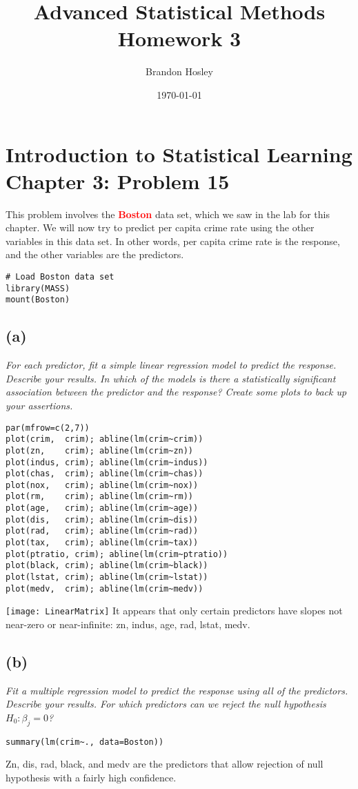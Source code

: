 \documentclass[a4paper,man,natbib]{apa6}
\title{Advanced Statistical Methods Homework 3}
\author{Brandon Hosley}
\date{\today}
\affiliation{University of Illinois - Springfield}
\begin{document}
\maketitle
\singlespacing

\section{Introduction to Statistical Learning \\ Chapter 3: Problem 15}
This problem involves the \textbf{\textcolor{red}{Boston}} data set, 
which we saw in the lab for this chapter. 
We will now try to predict per capita crime rate
using the other variables in this data set. 
In other words, per capita crime rate is the response, 
and the other variables are the predictors.

\begin{verbatim}
# Load Boston data set
library(MASS)
mount(Boston)
\end{verbatim}

\subsection{(a)} 
\emph{
	For each predictor, 
	fit a simple linear regression model to predict the response. 
	Describe your results. 
	In which of the models is there a statistically significant association
	between the predictor and the response? 
	Create some plots to back up your assertions.}
\begin{verbatim}
par(mfrow=c(2,7))
plot(crim,  crim); abline(lm(crim~crim)) 
plot(zn,    crim); abline(lm(crim~zn)) 
plot(indus, crim); abline(lm(crim~indus)) 
plot(chas,  crim); abline(lm(crim~chas))
plot(nox,   crim); abline(lm(crim~nox)) 
plot(rm,    crim); abline(lm(crim~rm))  
plot(age,   crim); abline(lm(crim~age))  
plot(dis,   crim); abline(lm(crim~dis))  
plot(rad,   crim); abline(lm(crim~rad))  
plot(tax,   crim); abline(lm(crim~tax))    
plot(ptratio, crim); abline(lm(crim~ptratio))
plot(black, crim); abline(lm(crim~black))
plot(lstat, crim); abline(lm(crim~lstat))
plot(medv,  crim); abline(lm(crim~medv))
\end{verbatim}
\texttt{[image: LinearMatrix]}
It appears that only certain predictors have slopes not near-zero or near-infinite:
zn, indus, age, rad, lstat, medv.

\subsection{(b)}
\emph{
	Fit a multiple regression model to predict the 
	response using all of the predictors. 
	Describe your results. 
	For which predictors can we reject the null hypothesis 
	$H_0 : \beta_j = 0$?
}
\begin{verbatim}
summary(lm(crim~., data=Boston))
\end{verbatim}
Zn, dis, rad, black, and medv are the predictors that allow rejection of null hypothesis with a fairly high confidence.
\end{document}
